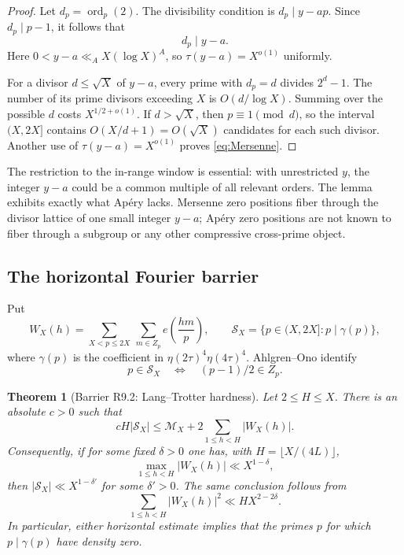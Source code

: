 \documentclass[11pt]{amsart}
\theoremstyle{plain}
\newtheorem{theorem}{Theorem}
\theoremstyle{remark}
\begin{document}
\begin{proof}
Let $d_p=\operatorname{ord}_p(2)$.  The divisibility condition is
$d_p\mid y-ap$.  Since $d_p\mid p-1$, it follows that
\[
 d_p\mid y-a.
 \tag{8.2}\label{eq:Mersenne-fibration}
\]
Here $0<y-a\ll_A X(\log X)^A$, so
$\tau(y-a)=X^{o(1)}$ uniformly.

For a divisor $d\leq\sqrt X$ of $y-a$, every prime with $d_p=d$
divides $2^d-1$.  The number of its prime divisors exceeding $X$ is
$O(d/\log X)$.  Summing over the possible $d$ costs
$X^{1/2+o(1)}$.  If $d>\sqrt X$, then $p\equiv1\pmod d$, so the
interval $(X,2X]$ contains $O(X/d+1)=O(\sqrt X)$ candidates for each
such divisor.  Another use of $\tau(y-a)=X^{o(1)}$ proves
\eqref{eq:Mersenne}.
\end{proof}

The restriction to the in-range window is essential: with unrestricted
$y$, the integer $y-a$ could be a common multiple of all relevant
orders.  The lemma exhibits exactly what Ap\'ery lacks.  Mersenne zero
positions fiber through the divisor lattice of one small integer
$y-a$; Ap\'ery zero positions are not known to fiber through a subgroup
or any other compressive cross-prime object.

\subsection{The horizontal Fourier barrier}

Put
\[
 W_X(h)=\sum_{X<p\leq2X}\ \sum_{m\in Z_p}e\left(\frac{hm}{p}\right),
 \qquad
 \mathcal S_X=\{p\in(X,2X]:p\mid\gamma(p)\},
 \tag{8.3}\label{eq:W-definition}
\]
where $\gamma(p)$ is the coefficient in
$\eta(2\tau)^4\eta(4\tau)^4$.  Ahlgren--Ono identify
\[
 p\in\mathcal S_X
 \quad\Longleftrightarrow\quad
 (p-1)/2\in Z_p.
 \tag{8.4}\label{eq:central-equivalence}
\]

\begin{theorem}[Barrier R9.2: Lang--Trotter hardness]
\label{thm:R92}
Let $2\leq H\leq X$.  There is an absolute $c>0$ such that
\[
 cH|\mathcal S_X|
 \leq\mathcal M_X+2\sum_{1\leq h<H}|W_X(h)|.
 \tag{8.5}\label{eq:Fejer-barrier}
\]
Consequently, if for some fixed $\delta>0$ one has, with
$H=\lfloor X/(4L)\rfloor$,
\[
 \max_{1\leq h<H}|W_X(h)|\ll X^{1-\delta},
 \tag{8.6}\label{eq:W-sup-bound}
\]
then $|\mathcal S_X|\ll X^{1-\delta'}$ for some $\delta'>0$.
The same conclusion follows from
\[
 \sum_{1\leq h<H}|W_X(h)|^2\ll H X^{2-2\delta}.
 \tag{8.7}\label{eq:W-second-bound}
\]
In particular, either horizontal estimate implies that the primes
$p$ for which $p\mid\gamma(p)$ have density zero.
\end{theorem}
\end{document}

